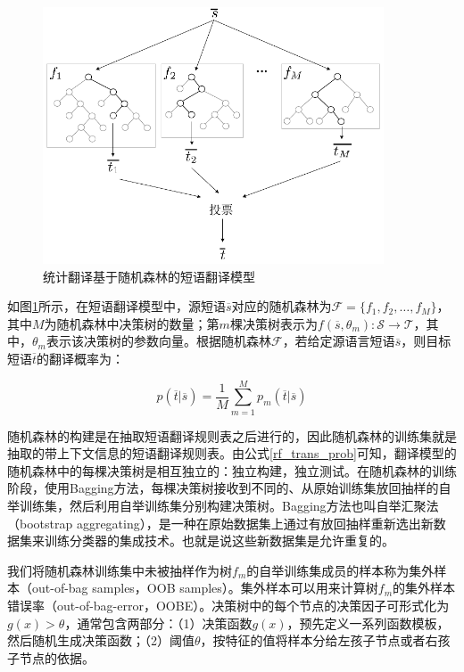 \begin{figure}[!tb]
	\centering
	\includegraphics[width=0.9\textwidth]{Figure/Figure_5_2.pdf}
	\caption{统计翻译基于随机森林的短语翻译模型}
	\label{Fig_random_forests}
\end{figure}

如图\ref{Fig_random_forests}所示，在短语翻译模型中，源短语$\overline{s} $对应的随机森林为$\mathcal{F} = \{ f_1,f_2,\ldots,f_M \}$，其中$M$为随机森林中决策树的数量；第$m$棵决策树表示为$f(\overline{s},\theta_m): \mathcal{S} \to \mathcal{T}$，其中，$\theta_m$表示该决策树的参数向量。根据随机森林$\mathcal{F}$，若给定源语言短语$\overline{s}$，则目标短语$\overline{t}$的翻译概率为：

\begin{equation}\label{rf_trans_prob}
p(\overline{t}|\overline{s}) = \frac{1}{M} \sum_{m=1}^{M}p_m (\overline{t}|\overline{s})
\end{equation}

随机森林的构建是在抽取短语翻译规则表之后进行的，因此随机森林的训练集就是抽取的带上下文信息的短语翻译规则表。由公式\ref{rf_trans_prob}可知，翻译模型的随机森林中的每棵决策树是相互独立的：独立构建，独立测试。在随机森林的训练阶段，使用Bagging方法，每棵决策树接收到不同的、从原始训练集放回抽样的自举训练集，然后利用自举训练集分别构建决策树。Bagging方法也叫自举汇聚法（bootstrap aggregating），是一种在原始数据集上通过有放回抽样重新选出新数据集来训练分类器的集成技术。也就是说这些新数据集是允许重复的。

我们将随机森林训练集中未被抽样作为树$f_m$的自举训练集成员的样本称为集外样本（out-of-bag samples，OOB samples）。集外样本可以用来计算树$f_m$的集外样本错误率（out-of-bag-error，OOBE）。决策树中的每个节点的决策因子可形式化为$g(x) > \theta$，通常包含两部分：（1）决策函数$g(x)$，预先定义一系列函数模板，然后随机生成决策函数；（2）阈值$\theta$，按特征的值将样本分给左孩子节点或者右孩子节点的依据。

